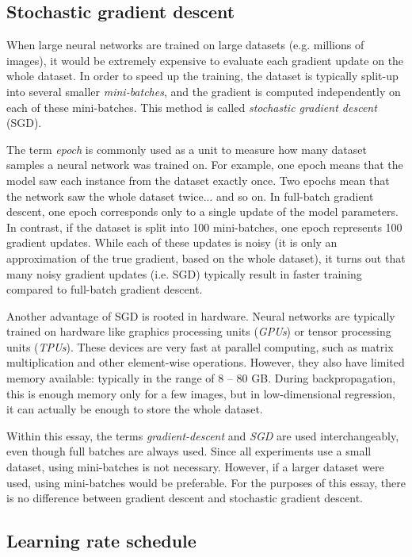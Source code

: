 \documentclass[12pt]{article}
\begin{document}
\subsection{Stochastic gradient descent}

When large neural networks are trained on large datasets (e.g. millions of images), it would be extremely expensive to evaluate each gradient update on the whole dataset. In order to speed up the training, the dataset is typically split-up into several smaller \textit{mini-batches}, and the gradient is computed independently on each of these mini-batches. This method is called \textit{stochastic gradient descent} (SGD).

The term \textit{epoch} is commonly used as a unit to measure how many dataset samples a neural network was trained on. For example, one epoch means that the model saw each instance from the dataset exactly once. Two epochs mean that the network saw the whole dataset twice... and so on. In full-batch gradient descent, one epoch corresponds only to a single update of the model parameters. In contrast, if the dataset is split into 100 mini-batches, one epoch represents 100 gradient updates. While each of these updates is noisy (it is only an approximation of the true gradient, based on the whole dataset), it turns out that many noisy gradient updates (i.e. SGD) typically result in faster training compared to full-batch gradient descent.

Another advantage of SGD is rooted in hardware. Neural networks are typically trained on hardware like graphics processing units (\textit{GPUs}) or tensor processing units (\textit{TPUs}). These devices are very fast at parallel computing, such as matrix multiplication and other element-wise operations. However, they also have limited memory available: typically in the range of 8 -- 80 GB. During backpropagation, this is enough memory only for a few images, but in low-dimensional regression, it can actually be enough to store the whole dataset.

Within this essay, the terms \textit{gradient-descent} and \textit{SGD} are used interchangeably, even though full batches are always used. Since all experiments use a small dataset, using mini-batches is not necessary. However, if a larger dataset were used, using mini-batches would be preferable. For the purposes of this essay, there is no difference between gradient descent and stochastic gradient descent.

\subsection{Learning rate schedule}
\end{document}
